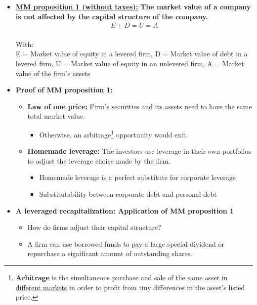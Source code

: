 \documentclass[ieeetran]{article}
\begin{document}
\begin{itemize}
\item \underline{\textbf{MM proposition 1 (without taxes):}} \textbf{The market value of a company is not affected by the capital structure of the company.}
	\large
	\begin{equation*}
	\boxed{
	\begin{aligned}
	E + D = U = A
	\end{aligned}
	}
	\end{equation*}
	\\
	\normalsize
	With:\\
	E = Market value of equity in a levered firm, D = Market value of debt in a levered firm, U = Market value of equity in an unlevered firm, A = Market value of the firm's assets

\item \textbf{Proof of MM proposition 1:}
	\begin{itemize}
	  \item \textbf{Law of one price:} Firm's securities and its assets need to have the same total market value.
		  \begin{itemize}
			  \item Otherwise, an arbitrage\footnote{\textbf{Arbitrage} is the simultaneous purchase and sale of the \underline{same asset in different markets} in order to profit from tiny differences in the asset's listed price.} opportunity would exit.
		  \end{itemize}
\item \textbf{Homemade leverage:} The investors use leverage in their own portfolios to adjust the leverage choice made by the firm.
	\begin{itemize}
	  \item Homemade leverage is a perfect substitute for corporate leverage
	\item Substitutability between corporate debt and personal debt
	\end{itemize}
	\end{itemize}
\item \textbf{A leveraged recapitalization: Application of MM proposition 1}
	\begin{itemize}
	  \item How do firms adjust their capital structure?
	\item A firm can use borrowed funds to pay a large special dividend or repurchase a significant amount of outstanding shares.
  \end{itemize}
\end{itemize}
\end{document}
